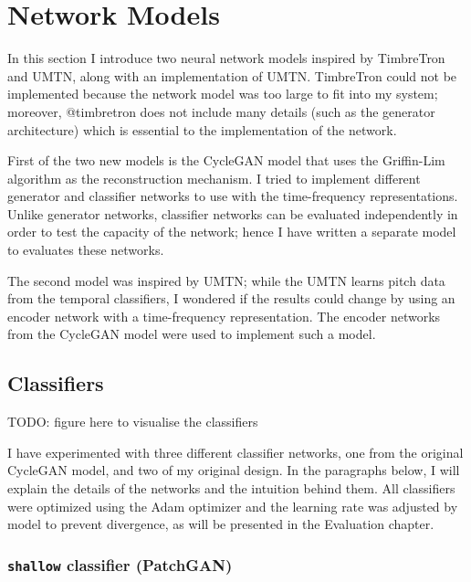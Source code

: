 \documentclass[12pt,a4paper,]{report}
\begin{document}
\hypertarget{network-models}{%
\section{Network Models}\label{network-models}}

In this section I introduce two neural network models inspired by
TimbreTron and UMTN, along with an implementation of UMTN. TimbreTron
could not be implemented because the network model was too large to fit
into my system; moreover, @timbretron does not include many details
(such as the generator architecture) which is essential to the
implementation of the network.

First of the two new models is the CycleGAN model that uses the
Griffin-Lim algorithm as the reconstruction mechanism. I tried to
implement different generator and classifier networks to use with the
time-frequency representations. Unlike generator networks, classifier
networks can be evaluated independently in order to test the capacity of
the network; hence I have written a separate model to evaluates these
networks.

The second model was inspired by UMTN; while the UMTN learns pitch data
from the temporal classifiers, I wondered if the results could change by
using an encoder network with a time-frequency representation. The
encoder networks from the CycleGAN model were used to implement such a
model.

\hypertarget{classifiers}{%
\subsection{Classifiers}\label{classifiers}}

TODO: figure here to visualise the classifiers

I have experimented with three different classifier networks, one from
the original CycleGAN model, and two of my original design. In the
paragraphs below, I will explain the details of the networks and the
intuition behind them. All classifiers were optimized using the Adam
optimizer and the learning rate was adjusted by model to prevent
divergence, as will be presented in the Evaluation chapter.

\hypertarget{shallow-classifier-patchgan}{%
\subsubsection{\texorpdfstring{\texttt{shallow} classifier
(PatchGAN)}{shallow classifier (PatchGAN)}}\label{shallow-classifier-patchgan}}
\end{document}
